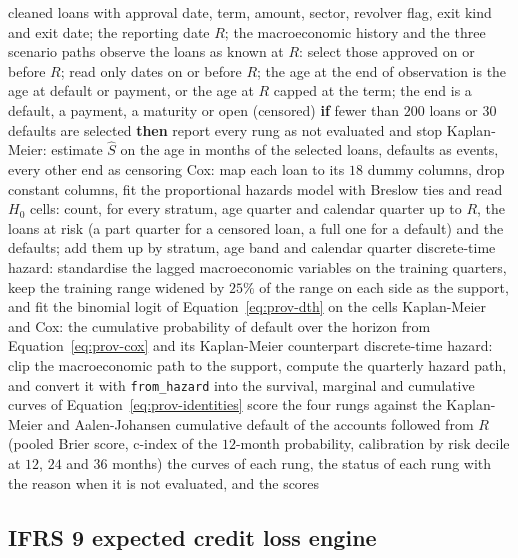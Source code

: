 \begin{algorithm}[htbp]
\caption{Fit of the Kaplan-Meier, discrete-time hazard and Cox rungs at a reporting date $R$ of case C06.}
\label{alg:prov-ladder}
\begin{algorithmic}[1]
\Require cleaned loans with approval date, term, amount, sector, revolver flag, exit kind and exit date; the reporting date $R$; the macroeconomic history and the three scenario paths
\State observe the loans as known at $R$: select those approved on or before $R$; read only dates on or before $R$; the age at the end of observation is the age at default or payment, or the age at $R$ capped at the term; the end is a default, a payment, a maturity or open (censored)
\State \textbf{if} fewer than $200$ loans or $30$ defaults are selected \textbf{then} report every rung as not evaluated and stop
\State Kaplan-Meier: estimate $\hat S$ on the age in months of the selected loans, defaults as events, every other end as censoring
\State Cox: map each loan to its $18$ dummy columns, drop constant columns, fit the proportional hazards model with Breslow ties and read $H_0$
\State cells: count, for every stratum, age quarter and calendar quarter up to $R$, the loans at risk (a part quarter for a censored loan, a full one for a default) and the defaults; add them up by stratum, age band and calendar quarter
\State discrete-time hazard: standardise the lagged macroeconomic variables on the training quarters, keep the training range widened by $25\%$ of the range on each side as the support, and fit the binomial logit of Equation~\ref{eq:prov-dth} on the cells
  \State Kaplan-Meier and Cox: the cumulative probability of default over the horizon from Equation~\ref{eq:prov-cox} and its Kaplan-Meier counterpart
  \State discrete-time hazard: clip the macroeconomic path to the support, compute the quarterly hazard path, and convert it with \texttt{from\_hazard} into the survival, marginal and cumulative curves of Equation~\ref{eq:prov-identities}
\EndFor
\State score the four rungs against the Kaplan-Meier and Aalen-Johansen cumulative default of the accounts followed from $R$ (pooled Brier score, c-index of the $12$-month probability, calibration by risk decile at $12$, $24$ and $36$ months)
\Ensure the curves of each rung, the status of each rung with the reason when it is not evaluated, and the scores
\end{algorithmic}
\end{algorithm}

\subsection{IFRS 9 expected credit loss engine}
\label{sec:m11}


